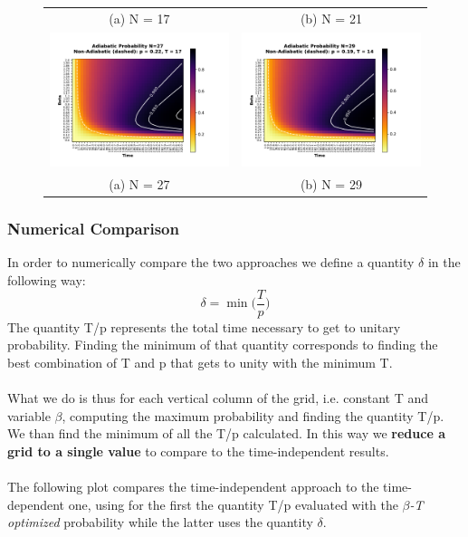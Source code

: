\documentclass[aps,pra,reprint, onecolumn]{revtex4-2}
\begin{document}
\begin{figure}
\begin{tabular}{cc}
(a) N = 17 & (b) N = 21\\[6pt]
\includegraphics[width=90mm]{./figures/27_probability_heatmap.pdf} &   \includegraphics[width=90mm]{./figures/29_probability_heatmap.pdf} \\
(a) N = 27 & (b) N = 29\\[6pt]
\end{tabular}
\end{figure}


\subsubsection{\textbf{Numerical Comparison}}
In order to numerically compare the two approaches we define a quantity $\delta$ in the following way:
\begin{equation}
  \delta = \min\Big(\frac{T}{p}\Big)
\end{equation}
The quantity T/p represents the total time necessary to get to unitary probability. Finding the minimum of that quantity corresponds to finding the best combination of T and p that gets to unity with the minimum T. \\ \\
What we do is thus for each vertical column of the grid, i.e. constant T and variable $\beta$, computing the maximum probability and finding the quantity T/p. We than find the minimum of all the T/p calculated. In this way we \textbf{reduce a grid to a single value} to compare to the time-independent results. \\ \\
The following plot compares the time-independent approach to the time-dependent one, using for the first the quantity T/p evaluated with the \textit{$\beta$-T optimized} probability while the latter uses the quantity $\delta$. \\
\end{document}
